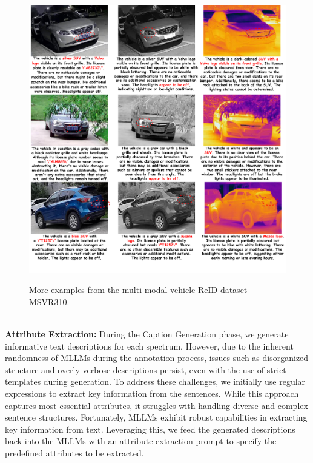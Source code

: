 \begin{figure}[t]
  \centering
    \resizebox{0.96\textwidth}{!}
    {
  \includegraphics[width=1.\linewidth]{sec/supp_img/More_Instance_Vehicle.pdf}
  }
  \vspace{-2mm}
   \caption{More examples from the multi-modal vehicle ReID dataset MSVR310.}
  \label{fig:more_instance_vehicle}
  \vspace{-6mm}
\end{figure}
\\
\textbf{Attribute Extraction:}
%
During the Caption Generation phase, we generate informative text descriptions for each spectrum. However, due to the inherent randomness of MLLMs during the annotation process, issues such as disorganized structure and overly verbose descriptions persist, even with the use of strict templates during generation.
%
To address these challenges, we initially use regular expressions to extract key information from the sentences. While this approach captures most essential attributes, it struggles with handling diverse and complex sentence structures. Fortunately, MLLMs exhibit robust capabilities in extracting key information from text.
%
Leveraging this, we feed the generated descriptions back into the MLLMs with an attribute extraction prompt to specify the predefined attributes to be extracted.
